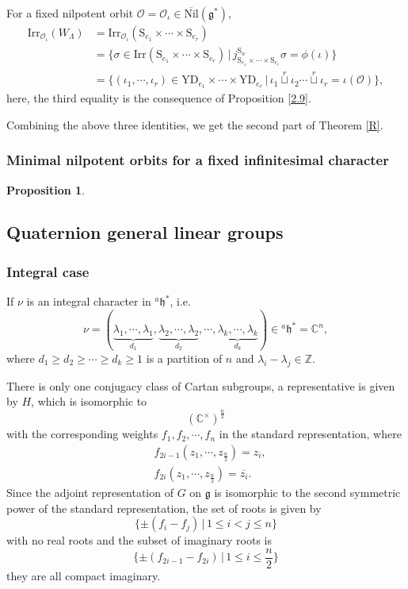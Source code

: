 \documentclass[12pt, a4paper]{amsart}
\numberwithin{equation}{section}
\newtheorem{prop}[thm]{Proposition}
\newcommand{\BC}{{\mathbb {C}}}
\newcommand{\BZ}{{\mathbb {Z}}}
\newcommand{\CO}{{\mathcal {O}}}
\newcommand{\fg}{\mathfrak{g}}
\newcommand{\fh}{\mathfrak{h}}
\newcommand{\Irr}{{\mathrm{Irr}}}
\newcommand{\Nil}{{\mathrm{Nil}}}
\newcommand{\set}[2]{\{#1\,|\,#2\}}
\renewcommand{\bar}{\overline}
\begin{document}
For a fixed nilpotent orbit $\CO = \CO_{\iota} \in \bar{\Nil}(\fg^*)$, 
\begin{align*}
    \Irr_{\CO_{\iota}}(W_{\Lambda}) & = \Irr_{\CO_{\iota}}(\mathrm{S}_{e_1} \times \cdots \times \mathrm{S}_{e_r})\\
    & = \set{\sigma \in \Irr(\mathrm{S}_{e_1} \times \cdots \times \mathrm{S}_{e_r})}{j_{\mathrm{S}_{e_1} \times \cdots \times \mathrm{S}_{e_r}}^{\mathrm{S}_n}\sigma = \phi(\iota)}\\
    & = \set{(\iota_1,\cdots,\iota_r) \in \mathrm{YD}_{e_1} \times \cdots \times \mathrm{YD}_{e_r}}{\iota_1 \mathop{\sqcup}\limits^r \iota_2 \cdots \mathop{\sqcup}\limits^r  \iota_r = \iota(\CO)},
\end{align*}
here, the third equality is the consequence of Proposition \ref{2.9}.

Combining the above three identities, we get the second part of Theorem \ref{R}.

\subsubsection{Minimal nilpotent orbits for a fixed infinitesimal character}

\begin{prop}
    
\end{prop}




\subsection{Quaternion general linear groups}
\subsubsection{Integral case}
If $\nu$ is an integral character in $^{a}\fh^*$, i.e. 
$$\nu =  (\underbrace{\lambda_1, \cdots, \lambda_1}_{d_1}, \underbrace{\lambda_2, \cdots, \lambda_2}_{d_2}, \cdots, \underbrace{\lambda_k, \cdots, \lambda_k}_{d_k} ) \in {^{a}\fh^*} = \BC^n,$$ 
where $d_1 \geq d_2 \geq \cdots \geq d_k \geq 1$ is a partition of $n$ and $\lambda_i - \lambda_j \in \BZ$. 

There is only one conjugacy class of Cartan subgroups, a representative is given by $H$, which is isomorphic to
$$(\BC^\times)^{\frac{n}{2}}$$
with the corresponding weights $f_1, f_2, \cdots ,f_n$ in the standard representation, where
\begin{align}
    &f_{2i-1}(z_1,\cdots,z_{\frac{n}{2}}) = z_i,\\
    &f_{2i}(z_1,\cdots,z_{\frac{n}{2}}) = \bar{z_i}.
\end{align}
Since the adjoint representation of $G$ on $\fg$ is isomorphic to the second symmetric power of the standard representation, the set of roots is given by
$$\set{\pm(f_i - f_j)}{1\leq i < j \leq n}$$
with no real roots and the subset of imaginary roots is
$$\set{\pm(f_{2i-1}-f_{2i})}{1 \leq i \leq \frac{n}{2}}$$
they are all compact imaginary. 
\end{document}
